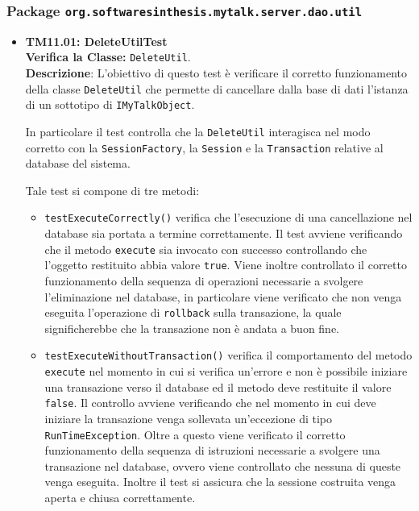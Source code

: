\subsubsection{Package \texttt{org.softwaresinthesis.mytalk.server.dao.util}}
\begin{itemize}

\item \textbf{TM11.01: DeleteUtilTest}\\
\textbf{Verifica la Classe:} \texttt{DeleteUtil}.\\
\textbf{Descrizione}: L'obiettivo di questo test è verificare il corretto funzionamento della classe \texttt{DeleteUtil} che permette di cancellare dalla base di dati l'istanza di un sottotipo di \texttt{IMyTalkObject}.

In particolare il test controlla che la \texttt{DeleteUtil} interagisca nel modo corretto con la \texttt{SessionFactory}, la \texttt{Session} e la \texttt{Transaction} relative al database del sistema.

Tale test si compone di tre metodi:
\begin{itemize}
\item \texttt{testExecuteCorrectly()} verifica che l'esecuzione di una cancellazione nel database sia portata a termine correttamente. Il test avviene verificando che il metodo \texttt{execute} sia invocato con successo controllando che l'oggetto restituito abbia valore \texttt{true}. Viene inoltre controllato il corretto funzionamento della sequenza di operazioni necessarie a svolgere l'eliminazione nel database, in particolare viene verificato che non venga eseguita l'operazione di \texttt{rollback} sulla transazione, la quale significherebbe che la transazione non è andata a buon fine.

\item \texttt{testExecuteWithoutTransaction()} verifica il comportamento del metodo\\ \texttt{execute} nel momento in cui si verifica un'errore e non è possibile iniziare una transazione verso il database ed il metodo deve restituite il valore \texttt{false}. Il controllo avviene verificando che nel momento in cui deve iniziare la transazione venga sollevata un'eccezione di tipo \texttt{RunTimeException}. Oltre a questo viene verificato il corretto funzionamento della sequenza di istruzioni necessarie a svolgere una transazione nel database, ovvero viene controllato che nessuna di queste venga eseguita. Inoltre il test si assicura che la sessione costruita venga aperta e chiusa correttamente.


\end{itemize}
\end{itemize}
